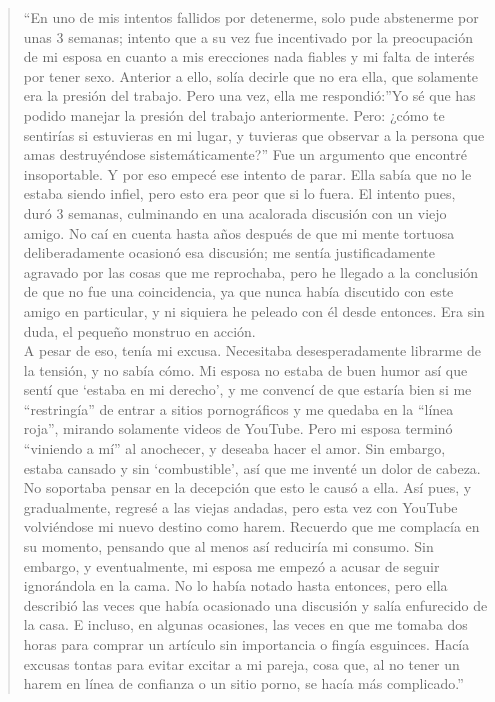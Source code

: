 \documentclass[
]{book}
\begin{document}
\begin{quote}
``En uno de mis intentos fallidos por detenerme, solo pude abstenerme por unas 3 semanas; intento que a su vez fue incentivado por la preocupación de mi esposa en cuanto a mis erecciones nada fiables y mi falta de interés por tener sexo. Anterior a ello, solía decirle que no era ella, que solamente era la presión del trabajo. Pero una vez, ella me respondió:''Yo sé que has podido manejar la presión del trabajo anteriormente. Pero: ¿cómo te sentirías si estuvieras en mi lugar, y tuvieras que observar a la persona que amas destruyéndose sistemáticamente?'' Fue un argumento que encontré insoportable. Y por eso empecé ese intento de parar. Ella sabía que no le estaba siendo infiel, pero esto era peor que si lo fuera. El intento pues, duró 3 semanas, culminando en una acalorada discusión con un viejo amigo. No caí en cuenta hasta años después de que mi mente tortuosa deliberadamente ocasionó esa discusión; me sentía justificadamente agravado por las cosas que me reprochaba, pero he llegado a la conclusión de que no fue una coincidencia, ya que nunca había discutido con este amigo en particular, y ni siquiera he peleado con él desde entonces. Era sin duda, el pequeño monstruo en acción.\\
A pesar de eso, tenía mi excusa. Necesitaba desesperadamente librarme de la tensión, y no sabía cómo. Mi esposa no estaba de buen humor así que sentí que `estaba en mi derecho', y me convencí de que estaría bien si me ``restringía'' de entrar a sitios pornográficos y me quedaba en la ``línea roja'', mirando solamente videos de YouTube. Pero mi esposa terminó ``viniendo a mí'' al anochecer, y deseaba hacer el amor. Sin embargo, estaba cansado y sin `combustible', así que me inventé un dolor de cabeza. No soportaba pensar en la decepción que esto le causó a ella. Así pues, y gradualmente, regresé a las viejas andadas, pero esta vez con YouTube volviéndose mi nuevo destino como harem. Recuerdo que me complacía en su momento, pensando que al menos así reduciría mi consumo. Sin embargo, y eventualmente, mi esposa me empezó a acusar de seguir ignorándola en la cama. No lo había notado hasta entonces, pero ella describió las veces que había ocasionado una discusión y salía enfurecido de la casa. E incluso, en algunas ocasiones, las veces en que me tomaba dos horas para comprar un artículo sin importancia o fingía esguinces. Hacía excusas tontas para evitar excitar a mi pareja, cosa que, al no tener un harem en línea de confianza o un sitio porno, se hacía más complicado.''
\end{quote}
\end{document}
